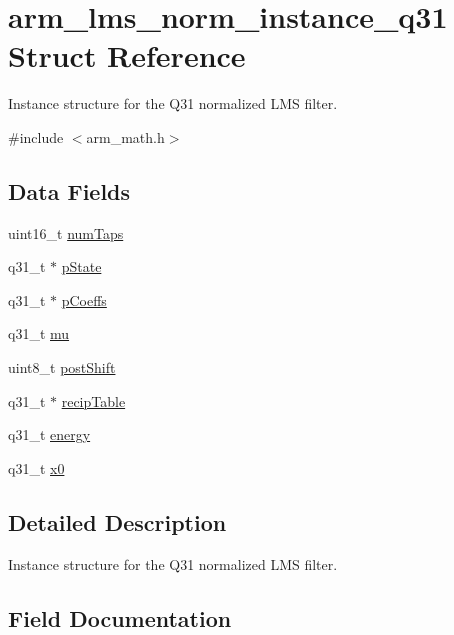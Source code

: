 \hypertarget{structarm__lms__norm__instance__q31}{}\section{arm\+\_\+lms\+\_\+norm\+\_\+instance\+\_\+q31 Struct Reference}
\label{structarm__lms__norm__instance__q31}


Instance structure for the Q31 normalized L\+MS filter.  




{\ttfamily \#include $<$arm\+\_\+math.\+h$>$}

\subsection*{Data Fields}
\begin{DoxyCompactItemize}
\item 
uint16\+\_\+t \hyperlink{structarm__lms__norm__instance__q31_a751941891e47f522a7f5375fe8990aac}{num\+Taps}
\item 
q31\+\_\+t $\ast$ \hyperlink{structarm__lms__norm__instance__q31_adee4ba3ee8869865af7d8fa08ca913d6}{p\+State}
\item 
q31\+\_\+t $\ast$ \hyperlink{structarm__lms__norm__instance__q31_a68888e36167d81cb7836db10367a1682}{p\+Coeffs}
\item 
q31\+\_\+t \hyperlink{structarm__lms__norm__instance__q31_a21ab4237a726ea7751f5026d89d2e577}{mu}
\item 
uint8\+\_\+t \hyperlink{structarm__lms__norm__instance__q31_a74050e9f36542bd56f4052381a82ae8f}{post\+Shift}
\item 
q31\+\_\+t $\ast$ \hyperlink{structarm__lms__norm__instance__q31_aec8a88dd688519b6b1e3c8d2e24bb775}{recip\+Table}
\item 
q31\+\_\+t \hyperlink{structarm__lms__norm__instance__q31_a012fee0f71095d2557bb633e73ef7355}{energy}
\item 
q31\+\_\+t \hyperlink{structarm__lms__norm__instance__q31_a973b8350a0c7b113a5f002bc0b86bf76}{x0}
\end{DoxyCompactItemize}


\subsection{Detailed Description}
Instance structure for the Q31 normalized L\+MS filter. 

\subsection{Field Documentation}
\mbox{\label{structarm__lms__norm__instance__q31_a012fee0f71095d2557bb633e73ef7355}} 
